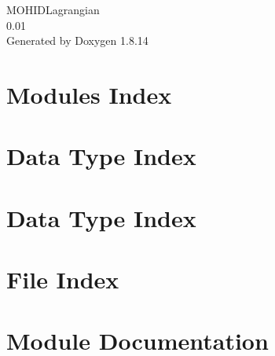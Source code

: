 \documentclass[twoside]{book}
\newcommand{\+}{\discretionary{\mbox{\scriptsize$\hookleftarrow$}}{}{}}
\newcommand{\clearemptydoublepage}{%
  \newpage{\pagestyle{empty}\cleardoublepage}%
}
\begin{document}
\hypersetup{pageanchor=false,
             bookmarksnumbered=true,
             pdfencoding=unicode
            }
\begin{titlepage}
\vspace*{7cm}
\begin{center}%
{\Large M\+O\+H\+I\+D\+Lagrangian \\[1ex]\large 0.\+01 }\\
\vspace*{1cm}
{\large Generated by Doxygen 1.8.14}\\
\end{center}
\end{titlepage}
\clearemptydoublepage
{}
\tableofcontents
\clearemptydoublepage
{}
\hypersetup{pageanchor=true}

\chapter{Modules Index}

\chapter{Data Type Index}

\chapter{Data Type Index}

\chapter{File Index}

\chapter{Module Documentation}















\end{document}
